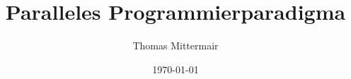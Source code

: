 



	\parindent 0cm 
	
	\title{Paralleles Programmierparadigma}
	\author{Thomas Mittermair}
	\date{\today}

	
	\clearpage
	
	
	\clearpage

	\setcounter{page}{1}
	
	\setcounter{tocdepth}{2} %
	\tableofcontents
	\cleardoublepage
	
	\setcounter{page}{1}
	
	
	
	\cleardoublepage
	
	
	
	\cleardoublepage
	
	
	
	\cleardoublepage
	
	\printbibliography %
	
	\listoffigures %
	
	\listoftables %
